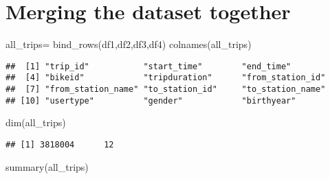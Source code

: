 \documentclass[
]{article}
\newenvironment{Shaded}{\begin{snugshade}}{\end{snugshade}}
\newcommand{\FunctionTok}[1]{\textcolor[rgb]{0.00,0.00,0.00}{#1}}
\newcommand{\NormalTok}[1]{#1}
\newcommand{\OtherTok}[1]{\textcolor[rgb]{0.56,0.35,0.01}{#1}}
\begin{document}
\hypertarget{merging-the-dataset-together}{%
\section{Merging the dataset
together}\label{merging-the-dataset-together}}

\begin{Shaded}
\begin{Highlighting}[]
\NormalTok{all\_trips}\OtherTok{=} \FunctionTok{bind\_rows}\NormalTok{(df1,df2,df3,df4)}
\FunctionTok{colnames}\NormalTok{(all\_trips)}
\end{Highlighting}
\end{Shaded}

\begin{verbatim}
##  [1] "trip_id"           "start_time"        "end_time"         
##  [4] "bikeid"            "tripduration"      "from_station_id"  
##  [7] "from_station_name" "to_station_id"     "to_station_name"  
## [10] "usertype"          "gender"            "birthyear"
\end{verbatim}

\begin{Shaded}
\begin{Highlighting}[]
\FunctionTok{dim}\NormalTok{(all\_trips)}
\end{Highlighting}
\end{Shaded}

\begin{verbatim}
## [1] 3818004      12
\end{verbatim}

\begin{Shaded}
\begin{Highlighting}[]
\FunctionTok{summary}\NormalTok{(all\_trips)}
\end{Highlighting}
\end{Shaded}
\end{document}
